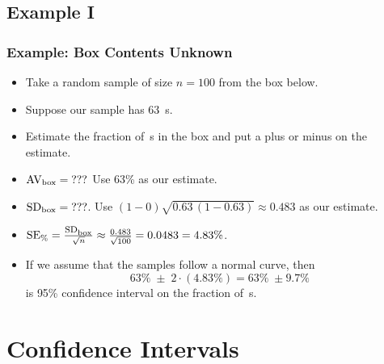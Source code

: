 \documentclass[t]{beamer}
\begin{document}
\subsection{Example I}
\begin{frame}
\frametitle{Example:  Box Contents Unknown}

\footnotesize

\begin{itemize}
\item<2-> Take a random sample of size $n=100$ from the box below.
\begin{center}
\vspace{2pt}
\end{center}
\item<3->  Suppose our sample has 63 \,s.  
\item<4->  Estimate the fraction of \,s in the 
       box and put a plus or minus on the estimate.
\item<4-> $\mbox{AV}_{\mbox{\scriptsize box}}=\mbox{???}$  Use 63\% as our estimate.
\item<5->  $\mbox{SD}_{\mbox{\scriptsize box}}=\mbox{???}$. 
    Use $(1-0)\sqrt{0.63\,(1-0.63)} \approx 0.483$ as our estimate.
\item<5-> 
  $\mbox{SE}_{\mbox{\scriptsize \%}}=
    \frac{\footnotesize\mbox{SD}_{\mbox{\scriptsize box}}}{\sqrt{n}}\approx 
    \frac{0.483}{\sqrt{100}} = 0.0483 = 4.83\%$.
\item<6-> If we assume that the samples follow a normal curve, then 
\[63\%\; \pm\; 2\cdot (4.83\%) = 63\%\; \pm 9.7\%\]
is {\color{blue}95\% confidence interval} on the fraction of 
   \,s.  
\end{itemize}

\end{frame}

\section{Confidence Intervals}
\end{document}
